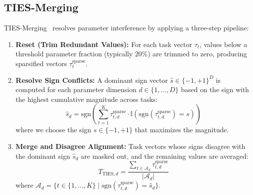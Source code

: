\documentclass{article}
\begin{document}
\subsection{TIES-Merging}
TIES-Merging~\cite{yadav2023ties} resolves parameter interference by applying a three-step pipeline:
\begin{enumerate}
    \item \textbf{Reset (Trim Redundant Values):} For each task vector $\tau_t$, values below a threshold parameter fraction (typically $20\%$) are trimmed to zero, producing sparsified vectors $\tau^{\text{sparse}}_t$.
    \item \textbf{Resolve Sign Conflicts:} A dominant sign vector $\hat{s} \in \{-1, +1\}^D$ is computed for each parameter dimension $d \in \{1,\dots,D\}$ based on the sign with the highest cumulative magnitude across tasks:
    \begin{equation}
        \hat{s}_d = \text{sgn}\left(\sum_{t=1}^K \tau^{\text{sparse}}_{t, d} \cdot \mathbb{I}(\text{sgn}(\tau^{\text{sparse}}_{t, d}) = s)\right)
    \end{equation}
    where we choose the sign $s \in \{-1, +1\}$ that maximizes the magnitude.
    \item \textbf{Merge and Disagree Alignment:} Task vectors whose signs disagree with the dominant sign $\hat{s}_d$ are masked out, and the remaining values are averaged:
    \begin{equation}
        T_{\text{TIES}, d} = \frac{\sum_{t \in \mathcal{A}_d} \tau^{\text{sparse}}_{t, d}}{|\mathcal{A}_d|}
    \end{equation}
    where $\mathcal{A}_d = \{t \in \{1,\dots,K\} \mid \text{sgn}(\tau^{\text{sparse}}_{t, d}) = \hat{s}_d\}$.
\end{enumerate}
\end{document}
